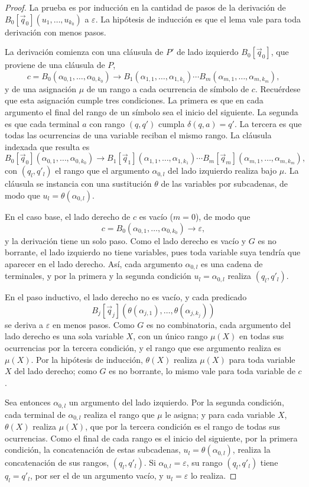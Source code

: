 \documentclass{report}
\theoremstyle{definition}
\theoremstyle{plain}
\begin{document}
\begin{proof}
La prueba es por inducción en la cantidad de pasos de la derivación de
$B_0[\vec q_0](u_1, \ldots, u_{k_0})$ a $\varepsilon$. La hipótesis de inducción
es que el lema vale para toda derivación con menos pasos.

La derivación comienza con una cláusula de $P'$ de lado izquierdo
$B_0[\vec q_0]$, que proviene de una cláusula de $P$,
\[
  c = B_0(\alpha_{0,1}, \ldots, \alpha_{0,k_0}) \to B_1(\alpha_{1,1}, \ldots, \alpha_{1,k_1}) \cdots B_m(\alpha_{m,1}, \ldots, \alpha_{m,k_m}),
\]
y de una asignación $\mu$ de un rango a cada ocurrencia de símbolo de $c$.
Recuérdese que esta asignación cumple tres condiciones. La primera es que
en cada argumento el final del rango de un símbolo sea el inicio del
siguiente. La segunda
es que cada terminal $a$ con rango $(q, q')$ cumpla $\delta(q, a) = q'$.
La tercera es que todas las ocurrencias de una variable reciban el mismo
rango. La cláusula indexada que resulta es
\[
  B_0[\vec q_0](\alpha_{0,1}, \ldots, \alpha_{0,k_0}) \to B_1[\vec q_1](\alpha_{1,1}, \ldots, \alpha_{1,k_1}) \cdots B_m[\vec q_m](\alpha_{m,1}, \ldots, \alpha_{m,k_m}),
\]
con $(q_l, q'_l)$ el rango que el argumento $\alpha_{0,l}$ del lado
izquierdo realiza bajo $\mu$. La cláusula se instancia con una sustitución $\theta$ de las
variables por subcadenas, de modo que $u_l = \theta(\alpha_{0,l})$.

En el caso base, el lado derecho de $c$ es vacío ($m = 0$), de modo que
\[
  c = B_0(\alpha_{0,1}, \ldots, \alpha_{0,k_0}) \to \varepsilon,
\]
y la derivación tiene un solo paso. Como el lado derecho es vacío y $G$
es no borrante, el lado izquierdo no tiene variables, pues toda variable
suya tendría que aparecer en el lado derecho. Así, cada argumento
$\alpha_{0,l}$ es una cadena de terminales, y por la primera y la segunda
condición $u_l = \alpha_{0,l}$ realiza $(q_l, q'_l)$.

En el paso inductivo, el lado derecho no es vacío, y cada predicado
\[
  B_j[\vec q_j](\theta(\alpha_{j,1}), \ldots, \theta(\alpha_{j,k_j}))
\]
se deriva a $\varepsilon$ en menos pasos. Como $G$ es no combinatoria, cada
argumento del lado derecho es una sola variable $X$, con un único rango
$\mu(X)$ en todas sus ocurrencias por la tercera condición, y el rango
que ese argumento realiza es $\mu(X)$. Por la hipótesis de inducción, $\theta(X)$ realiza $\mu(X)$
para toda variable $X$ del lado derecho; como $G$ es no borrante, lo
mismo vale para toda variable de $c$.

Sea entonces $\alpha_{0,l}$ un argumento del lado izquierdo. Por la
segunda condición, cada terminal de $\alpha_{0,l}$ realiza el rango que
$\mu$ le asigna; y para cada variable $X$, $\theta(X)$ realiza $\mu(X)$,
que por la tercera condición es el rango de todas sus ocurrencias. Como
el final de cada rango es el inicio del siguiente, por la primera
condición, la concatenación de estas subcadenas,
$u_l = \theta(\alpha_{0,l})$, realiza la concatenación de sus rangos,
$(q_l, q'_l)$. Si
$\alpha_{0,l} = \varepsilon$, su rango $(q_l, q'_l)$ tiene $q_l = q'_l$,
por ser el de un argumento vacío, y $u_l = \varepsilon$ lo realiza.
\end{proof}
\end{document}
